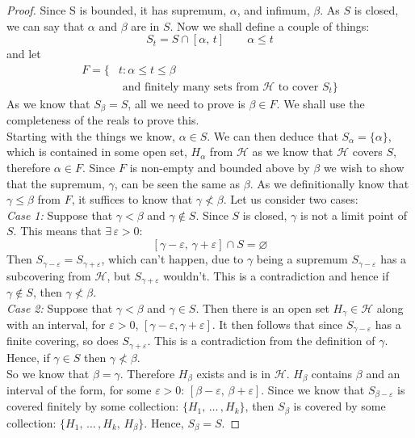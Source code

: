 \documentclass{article}
\renewcommand{\a}{\alpha}
\renewcommand{\b}{\beta}
\newcommand{\g}{\gamma}
\newcommand{\e}{\varepsilon}
\newcommand{\ex}{\exists\,}
\begin{document}
\begin{proof}
  Since S is bounded, it has supremum, $\a$, and infimum, $\b$. As $S$ is closed, we can say that $\a$ and $\b$ are in $S$. Now we shall define a couple of things:
  $$ S_t = S \cap [\a,\, t] \qquad \a \le t $$
  and let
  \begin{align*}
    F = \{ &t : \a \le t \le \b \\
    &\text{ and finitely many sets from $\mathcal{H}$ to cover $S_t$} \}
  \end{align*}
  As we know that $\displaystyle{S_\b = S}$, all we need to prove is $\displaystyle{\b \in F}$. We shall use the completeness of the reals to prove this.\\

  \noindent
  Starting with the things we know, $\displaystyle{\a \in S}$. We can then deduce that $\displaystyle{S_\a = \{ \a \}}$, which is contained in some open set, $H_\a$ from $\mathcal{H}$ as we know that $\mathcal{H}$ covers $S$, therefore $\a \in F$. Since $F$ is non-empty and bounded above by $\b$ we wish to show that the supremum, $\g$, can be seen the same as $\b$. As we definitionally know that $\g \le \b$ from $F$, it suffices to know that $\g \nless \b$. Let us consider two cases:\\

  \noindent
  \emph{Case 1:} Suppose that $\g < \b$ and $\g \notin S$. Since $S$ is closed, $\g$ is not a limit point of $S$. This means that $\ex \e > 0:$
  $$ [\g - \e,\, \g + \e] \cap S = \varnothing $$
  Then $S_{\g - \e} = S_{\g + \e}$, which can't happen, due to $\g$ being a supremum $S_{\g - \e}$ has a subcovering from $\mathcal{H}$, but $S_{\g + \e}$ wouldn't. This is a contradiction and hence if $\g \notin S$, then $\g \nless \b$.\\

  \noindent
  \emph{Case 2:} Suppose that $\g < \b$ and $\g \in S$. Then there is an open set $H_\g \in \mathcal{H}$ along with an interval, for $\e > 0$, $[\g - \e, \g + \e]$. It then follows that since $S_{\g - \e}$ has a finite covering, so does $S_{\g + \e}$. This is a contradiction from the definition of $\g$. Hence, if $\g \in S$ then $\g \nless \b$.\\

  \noindent
  So we know that $\b = \g$. Therefore $H_\b$ exists and is in $\mathcal{H}$. $H_\b$ contains $\b$ and an interval of the form, for some $\e > 0$: $[\b - \e,\, \b + \e]$. Since we know that $S_{\b - \e}$ is covered finitely by some collection: $\{ H_1,\, \dots\,, H_k \}$, then $S_\b$ is covered by some collection: $\{ H_1,\, \dots\,, H_k,\, H_\b \}$. Hence, $S_\b = S$.
\end{proof}
\end{document}
